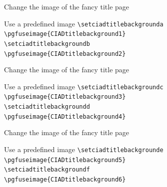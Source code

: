 \documentclass[english,sectioncirclenumberstyle]{ciadbeamer}
\begin{document}
\begin{frame}{Change the image of the fancy title page}
	\begin{block}{Use a predefined image}
		\texttt{{\textbackslash}setciadtitlebackgrounda}  \\
		\texttt{\textbackslash{}pgfuseimage\{CIADtitlebackground1\}} \\
		\texttt{{\textbackslash}setciadtitlebackgroundb}  \\
		\texttt{\textbackslash{}pgfuseimage\{CIADtitlebackground2\}}
	\end{block}
\end{frame}

\begin{frame}{Change the image of the fancy title page \insertcontinuationtext}
	\begin{block}{Use a predefined image}
		\texttt{{\textbackslash}setciadtitlebackgroundc}  \\
		\texttt{\textbackslash{}pgfuseimage\{CIADtitlebackground3\}} \\
		\texttt{{\textbackslash}setciadtitlebackgroundd}  \\
		\texttt{\textbackslash{}pgfuseimage\{CIADtitlebackground4\}}
	\end{block}
\end{frame}

\begin{frame}{Change the image of the fancy title page \insertcontinuationtext}
	\begin{block}{Use a predefined image}
		\texttt{{\textbackslash}setciadtitlebackgrounde}  \\
		\texttt{\textbackslash{}pgfuseimage\{CIADtitlebackground5\}} \\
		\texttt{{\textbackslash}setciadtitlebackgroundf}  \\
		\texttt{\textbackslash{}pgfuseimage\{CIADtitlebackground6\}}
	\end{block}
\end{frame}
\end{document}
